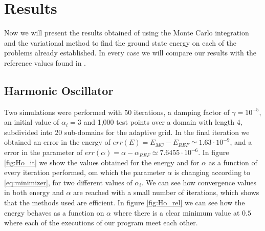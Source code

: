 
\section{Results}
Now we will present the results obtained of using the Monte Carlo integration and the variational
method to find the ground state energy on each of the problems already established. In every case
we will compare
our results with the reference values found in \cite{JosBook}.

\subsection{Harmonic Oscillator}
Two simulations were performed with 50 iterations, a damping factor of $\gamma = 10^{-5}$,
an initial value of $\alpha_i = 3$  and 1,000 test points over a domain with length 4,
subdivided into 20 sub-domains for the adaptive grid. In the final iteration we obtained an
error in the energy of $err(E)=E_{MC}-E_{REF}\simeq 1.63\cdot 10^{-9}$,
and a error in the parameter of $err(\alpha)=\alpha - \alpha_{REF} \simeq 7.6455\cdot 10^{-6}$. In figure \ref{fig:Ho_it}
we show the values obtained for the energy and for $\alpha$ as a function of every iteration performed,
om which the parameter $\alpha$ is changing according to \ref{eq:minimizer},
for two different values of $\alpha_i$. We can see how  convergence values in both energy and $\alpha$ are
reached with a small number of iterations, which shows that the methods used are efficient. In figure
 \ref{fig:Ho_rel} we can see how the energy behaves as a function on $\alpha$ where there is a clear
minimum value at $0.5$ where each of the executions of our program meet each other.
